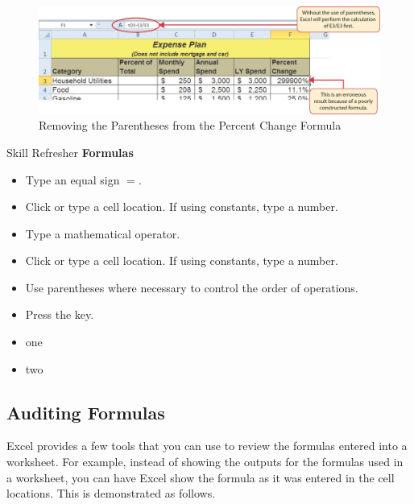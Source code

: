 \begin{figure}[H]
	\centering
	\includegraphics[width=\maxwidth{.95\linewidth}]{gfx/ch02_fig07}
	\caption{Removing the Parentheses from the Percent Change Formula}
	\label{02:fig07}
\end{figure}

\begin{center}
	\begin{sklbox}{Skill Refresher}
		\textbf{Formulas}
		\\
		\begin{itemize}
			\setlength{\itemsep}{0pt}
			\setlength{\parskip}{0pt}
			\setlength{\parsep}{0pt}
			
			\item Type an equal sign $ = $.
			\item Click or type a cell location. If using constants, type a number.
			\item Type a mathematical operator.
			\item Click or type a cell location. If using constants, type a number.
			\item Use parentheses where necessary to control the order of operations.
			\item Press the  key.

			\item one
			\item two
			
		\end{itemize}
	\end{sklbox}
\end{center}

\subsection{Auditing Formulas}

Excel provides a few tools that you can use to review the formulas entered into a worksheet. For example, instead of showing the outputs for the formulas used in a worksheet, you can have Excel show the formula as it was entered in the cell locations. This is demonstrated as follows.

